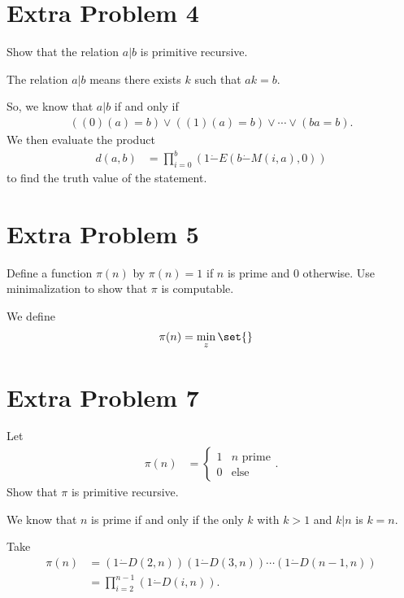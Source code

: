 \documentclass[10pt]{mypackage}
\begin{document}
\section{Extra Problem 4}%
\begin{problem}
  Show that the relation $a|b$ is primitive recursive.
\end{problem}
\begin{solution}
  The relation $a|b$ means there exists $k$ such that $ak = b$.\newline

  So, we know that $a|b$ if and only if
  \begin{align*}
    \left(\left(0\right)\left(a\right) = b\right) \vee \left(\left(1\right)\left(a\right) = b\right) \vee \cdots \vee \left(ba = b\right).
  \end{align*}
  We then evaluate the product
  \begin{align*}
    d\left(a,b\right) &= \prod_{i=0}^{b}\left(1\dot{-}E(b\dot{-}M(i,a),0)\right)
  \end{align*}
  to find the truth value of the statement.
\end{solution}
\section{Extra Problem 5}%
\begin{problem}
  Define a function $\pi(n)$ by $\pi(n) = 1$ if $n$ is prime and $0$ otherwise. Use minimalization to show that $\pi$ is computable.
\end{problem}
\begin{solution}
  We define
  \begin{align*}
    \pi(n) &= \min_{z}\set{}
  \end{align*}
  
\end{solution}

\section{Extra Problem 7}%
\begin{problem}
  Let
  \begin{align*}
    \pi(n) &= \begin{cases}
      1 & \text{$n$ prime}\\
      0 & \text{else}
    \end{cases}.
  \end{align*}
  Show that $\pi$ is primitive recursive.
\end{problem}
\begin{solution}
  We know that $n$ is prime if and only if the only $k$ with $k > 1$ and $k | n$ is $k=n$.\newline

  Take
  \begin{align*}
    \pi\left(n\right) &= \left(1\dot{-}D\left(2,n\right)\right)\left(1\dot{-}D\left(3,n\right)\right)\cdots \left(1\dot{-}D\left(n-1,n\right)\right)\\
                      &= \prod_{i=2}^{n-1}\left(1\dot{-}D\left(i,n\right)\right).
  \end{align*}
  
\end{solution}
\end{document}
